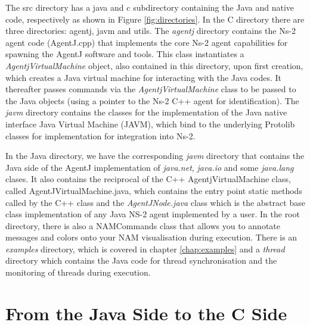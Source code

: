 The src directory has a java and c subdirectory containing the Java and native
code, respectively as shown in Figure \ref{fig:directories}.  In the C directory there are three directories: agentj, javm and utils.  The \emph{agentj} directory contains the 
Ns-2 agent code (AgentJ.cpp) that implements the core Ns-2 agent capabilities for 
spawning the AgentJ software and tools. This class instantiates a \emph{AgentjVirtualMachine} object, also contained in this directory, upon first creation, which creates a Java virtual machine for interacting with the Java codes.  It thereafter passes commands via the \emph{AgentjVirtualMachine} class to be passed to the Java objects (using a pointer to the Ns-2 C++ agent for identification). The \emph{javm} directory contains the classes for the implementation of the Java native interface Java Virtual Machine (JAVM), which bind to the underlying Protolib classes for implementation for integration into Ns-2.  


In the Java directory, we have the corresponding \emph{javm} directory that contains the Java side of the AgentJ implementation of \emph{java.net}, \emph{java.io} and some \emph{java.lang} clases.  It also contains the reciprocal of the C++ AgentjVirtualMachine class, called AgentJVirtualMachine.java, which contains the entry point static methods called by the C++ class and the \emph{AgentJNode.java} class which is the abstract base class implementation of any Java NS-2 agent implemented by a user. In the root directory, there is also a NAMCommands class that allows you to annotate messages and colors onto your NAM visualisation during execution. There is an \emph{examples} directory, which is covered in chapter \ref{chap:examples} and a \emph{thread} directory which contains the Java code for thread synchronisation and the monitoring of threads during execution. 


\section{From the Java Side to the C Side}

